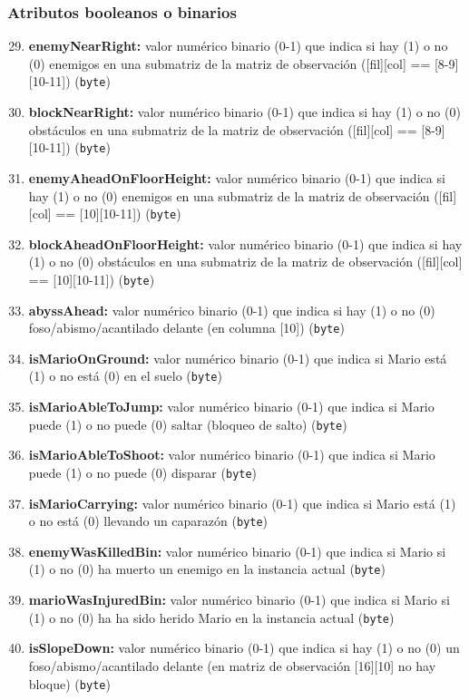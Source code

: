 \documentclass[10pt, spanish, pdftex]{../.template/template}
\begin{document}
    \subsubsection{Atributos booleanos o binarios}
    \begin{enumerate}
        \setcounter{enumi}{28}
        \item \textbf{enemyNearRight:} valor numérico binario (0-1) que indica si hay (1) o no (0) enemigos en una submatriz de la matriz de observación ([fil][col] == [8-9][10-11]) (\texttt{byte})
        \item \textbf{blockNearRight:} valor numérico binario (0-1) que indica si hay (1) o no (0) obstáculos en una submatriz de la matriz de observación ([fil][col] == [8-9][10-11]) (\texttt{byte})
        \item \textbf{enemyAheadOnFloorHeight:} valor numérico binario (0-1) que indica si hay (1) o no (0) enemigos en una submatriz de la matriz de observación ([fil][col] == [10][10-11]) (\texttt{byte})
        \item \textbf{blockAheadOnFloorHeight:} valor numérico binario (0-1) que indica si hay (1) o no (0) obstáculos en una submatriz de la matriz de observación ([fil][col] == [10][10-11]) (\texttt{byte})
        \item \textbf{abyssAhead:} valor numérico binario (0-1) que indica si hay (1) o no (0) foso/abismo/acantilado delante (en columna [10]) (\texttt{byte})
        \item \textbf{isMarioOnGround:} valor numérico binario (0-1) que indica si Mario está (1) o no está (0) en el suelo (\texttt{byte})
        \item \textbf{isMarioAbleToJump:} valor numérico binario (0-1) que indica si Mario puede (1) o no puede (0) saltar (bloqueo de salto) (\texttt{byte})
        \item \textbf{isMarioAbleToShoot:} valor numérico binario (0-1) que indica si Mario puede (1) o no puede (0) disparar (\texttt{byte})
        \item \textbf{isMarioCarrying:} valor numérico binario (0-1) que indica si Mario está (1) o no está (0) llevando un caparazón (\texttt{byte})
        \item \textbf{enemyWasKilledBin:} valor numérico binario (0-1) que indica si Mario si (1) o no (0) ha muerto un enemigo en la instancia actual (\texttt{byte})
        \item \textbf{marioWasInjuredBin:} valor numérico binario (0-1) que indica si Mario si (1) o no (0) ha ha sido herido Mario en la instancia actual (\texttt{byte})
        \item \textbf{isSlopeDown:} valor numérico binario (0-1) que indica si hay (1) o no (0) un foso/abismo/acantilado delante (en matriz de observación [16][10] no hay bloque) (\texttt{byte})
    \end{enumerate}
\end{document}
